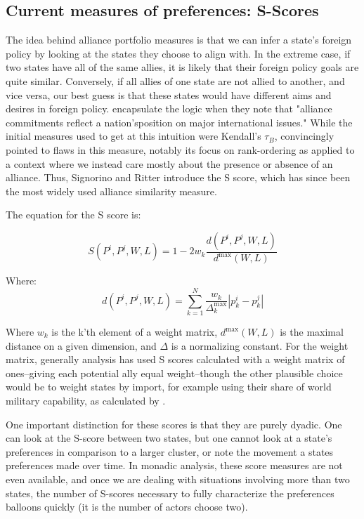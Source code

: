 \documentclass[fignum,letterpaper,12pt]{amsart}
\begin{document}
\subsection{Current measures of preferences: S-Scores}
The idea behind alliance portfolio measures is that we can infer a state's foreign policy by looking at the states they choose to align with. In the extreme case, if two states have all of the same allies, it is likely that their foreign policy goals are quite similar. Conversely, if all allies of one state are not allied to another, and vice versa, our best guess is that these states would have different aims and desires in foreign policy. \citet{altman:bdm:1979} encapsulate the logic when they note that "alliance commitments reflect a nation'sposition on major international issues." While the initial measures used to get at this intuition were Kendall's $\tau_{B}$, \citet{signorino:ritter:1999} convincingly pointed to flaws in this measure, notably its focus on rank-ordering as applied to a context where we instead care mostly about the presence or absence of an alliance. Thus, Signorino and Ritter introduce the S score, which has since been the most widely used alliance similarity measure.

The equation for the S score is:

\begin{equation}
S(P^i, P^j, W, L) = 1 - 2w_k \frac{d(P^i, P^j, W, L)}{d^{\text{max}}(W,L)}
\end{equation}

Where:
\begin{equation}
d(P^i, P^j, W, L) = \sum_{k = 1}^N \frac{w_k}{\Delta^\text{max}_{k}} |p^i_k - p^j_k|
\end{equation}

Where $w_k$ is the k'th element of a weight matrix, $d^\text{max}(W,L)$ is the maximal distance on a given dimension, and $\Delta$ is a normalizing constant. For the weight matrix, generally analysis has used S scores calculated with a weight matrix of ones--giving each potential ally equal weight--though the other plausible choice would be to weight states by import, for example using their share of world military capability, as calculated by \citet{cinc}.

One important distinction for these scores is that they are purely dyadic. One can look at the S-score between two states, but one cannot look at a state's preferences in comparison to a larger cluster, or note the movement a states preferences made over time. In monadic analysis, these score measures are not even available, and once we are dealing with situations involving more than two states, the number of S-scores necessary to fully characterize the preferences balloons quickly (it is the number of actors choose two).
\end{document}
